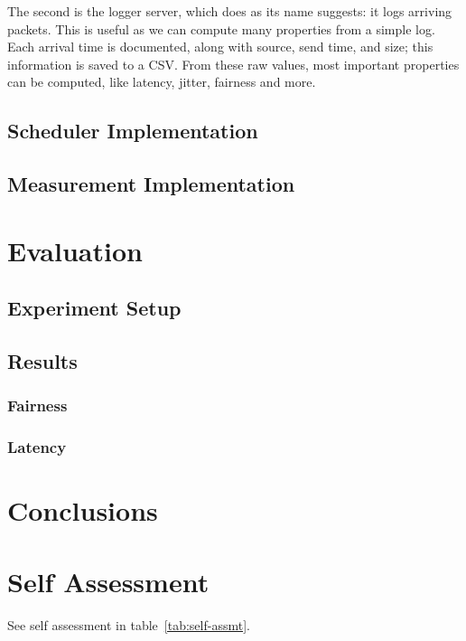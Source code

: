 \documentclass[conference]{IEEEtran}
\begin{document}
The second is the logger server, which does as its name suggests: it logs arriving packets.
This is useful as we can compute many properties from a simple log.
Each arrival time is documented, along with source, send time, and size; this information is saved to a CSV.
From these raw values, most important properties can be computed, like latency, jitter, fairness and more.

    \subsection{Scheduler Implementation}

    \subsection{Measurement Implementation}

    \section{Evaluation}
    \subsection{Experiment Setup}

    \subsection{Results}

    \subsubsection{Fairness}

    \subsubsection{Latency}

    \section{Conclusions}

    \section{Self Assessment}
    See self assessment in table~\ref{tab:self-assmt}.
\end{document}
